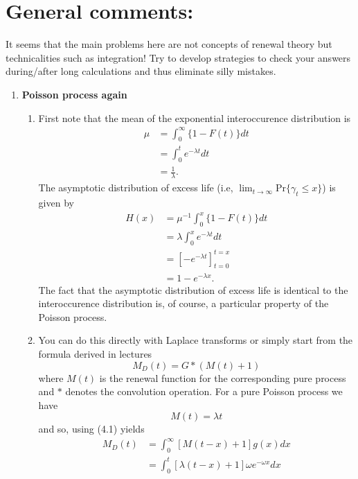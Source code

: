 \documentclass[11pt,a4paper]{article}
\begin{document}
  \section*{General comments:}
  It seems that the main problems here are not concepts of renewal theory but technicalities such as integration! Try to develop strategies to check your answers during/after long calculations and thus eliminate silly mistakes.
  \begin{enumerate}
    \item \textbf{Poisson process again}
    \begin{enumerate}
      \item First note that the mean of the exponential interoccurence distribution is
      \begin{align*}
        \mu
        &= \int_0^\infty \{1 - F(t)\}dt\\
        &= \int_0^t e^{-\lambda t}dt\\
        &= \frac{1}{\lambda}.
      \end{align*}
      The asymptotic distribution of excess life (i.e, $\lim_{t \to \infty}\text{Pr}\{\gamma_t \leq x\}$) is given by
      \begin{align*}
        H(x)
        &= \mu^{-1}\int_0^x\{1 - F(t)\}dt\\
        &= \lambda\int_0^xe^{-\lambda t}dt\\
        &= \left[-e^{-\lambda t}\right]_{t = 0}^{t = x}\\
        &= 1 - e^{-\lambda x}.
      \end{align*}
      The fact that the asymptotic distribution of excess life is identical to the interoccurence distribution is, of course, a particular property of the Poisson process.
      \item You can do this directly with Laplace transforms or simply start from the formula derived in lectures
      \begin{equation}\tag{4.1}
        M_D(t) = G*(M(t) + 1)
      \end{equation}
      where $M(t)$ is the renewal function for the corresponding pure process and $*$ denotes the convolution operation. For a pure Poisson process we have
      $$
      M(t) = \lambda t
      $$
      and so, using (4.1) yields
      \begin{align*}
        M_D(t)
        &= \int_0^\infty[M(t - x) + 1]g(x)dx\\
        &= \int_0^t[\lambda(t - x) + 1]\omega e^{-\omega x}dx\\

\end{align*}
\end{enumerate}
\end{enumerate}
\end{document}
